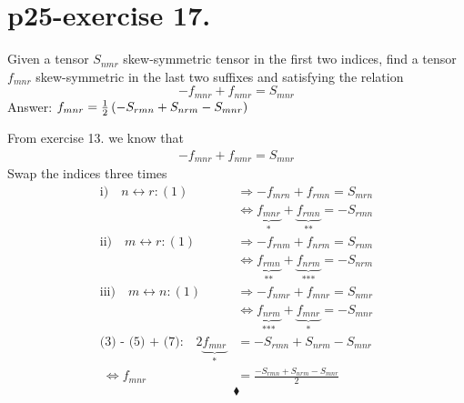 \section{p25-exercise 17.}
\begin{tcolorbox}
Given a tensor $S_{nmr}$  skew-symmetric tensor in the first two indices, find a tensor $f_{mnr}$ skew-symmetric in the last two suffixes and satisfying the relation 
 $$-f_{mnr} + f_{nmr} = S_{mnr}$$
 Answer: $f_{mnr}= \frac{1}{2}\left(-S_{rmn}+S_{nrm}-S_{mnr}\right)$
\end{tcolorbox}
From exercise 13. we know that 
\begin{align}
-f_{mnr} + f_{nmr} = S_{mnr}
\end{align}
Swap the indices three times
\begin{align}
\text{i)}\quad n \leftrightarrow r: (1) &\Rightarrow -f_{mrn} + f_{rmn } = S_{mrn}\\
\ &\Leftrightarrow \underbrace{f_{mnr}}_\text{*} + \underbrace{f_{rmn }}_\text{**} = -S_{rmn}\\
\text{ii)}\quad m \leftrightarrow r: (1) &\Rightarrow -f_{rnm} + f_{nrm } = S_{rnm}\\
\ &\Leftrightarrow \underbrace{f_{rmn}}_\text{**} + \underbrace{f_{nrm }}_\text{***} = -S_{nrm}\\
\text{iii)}\quad m \leftrightarrow n: (1) &\Rightarrow -f_{nmr} + f_{mnr } = S_{nmr}\\
\ &\Leftrightarrow \underbrace{f_{nrm}}_\text{***} + \underbrace{f_{mnr }}_\text{*} = -S_{mnr}\\
\text{(3) - (5) + (7):} \quad 2\underbrace{f_{mnr}}_\text{*} &= -S_{rmn}+S_{nrm}-S_{mnr}\\
\ \Leftrightarrow f_{mnr} &= \frac{-S_{rmn}+S_{nrm}-S_{mnr}}{2}
\end{align}
$$\blacklozenge$$
\pagebreak[4]
